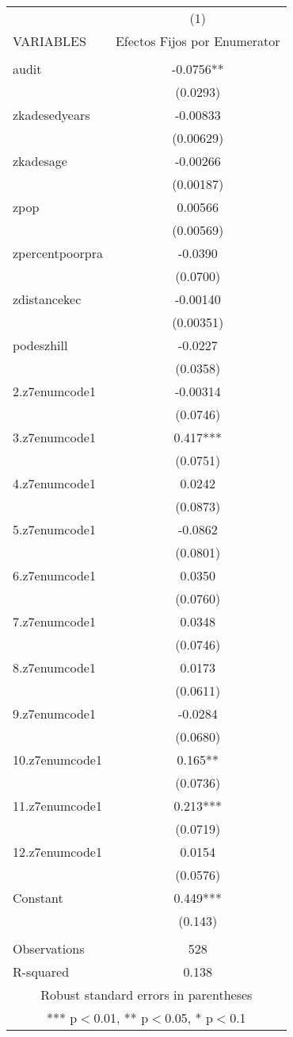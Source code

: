 \begin{tabular}{lc} \hline
 & (1) \\
VARIABLES & Efectos Fijos por Enumerator \\ \hline
 &  \\
audit & -0.0756** \\
 & (0.0293) \\
zkadesedyears & -0.00833 \\
 & (0.00629) \\
zkadesage & -0.00266 \\
 & (0.00187) \\
zpop & 0.00566 \\
 & (0.00569) \\
zpercentpoorpra & -0.0390 \\
 & (0.0700) \\
zdistancekec & -0.00140 \\
 & (0.00351) \\
podeszhill & -0.0227 \\
 & (0.0358) \\
2.z7enumcode1 & -0.00314 \\
 & (0.0746) \\
3.z7enumcode1 & 0.417*** \\
 & (0.0751) \\
4.z7enumcode1 & 0.0242 \\
 & (0.0873) \\
5.z7enumcode1 & -0.0862 \\
 & (0.0801) \\
6.z7enumcode1 & 0.0350 \\
 & (0.0760) \\
7.z7enumcode1 & 0.0348 \\
 & (0.0746) \\
8.z7enumcode1 & 0.0173 \\
 & (0.0611) \\
9.z7enumcode1 & -0.0284 \\
 & (0.0680) \\
10.z7enumcode1 & 0.165** \\
 & (0.0736) \\
11.z7enumcode1 & 0.213*** \\
 & (0.0719) \\
12.z7enumcode1 & 0.0154 \\
 & (0.0576) \\
Constant & 0.449*** \\
 & (0.143) \\
 &  \\
Observations & 528 \\
 R-squared & 0.138 \\ \hline
\multicolumn{2}{c}{ Robust standard errors in parentheses} \\
\multicolumn{2}{c}{ *** p$<$0.01, ** p$<$0.05, * p$<$0.1} \\
\end{tabular}

